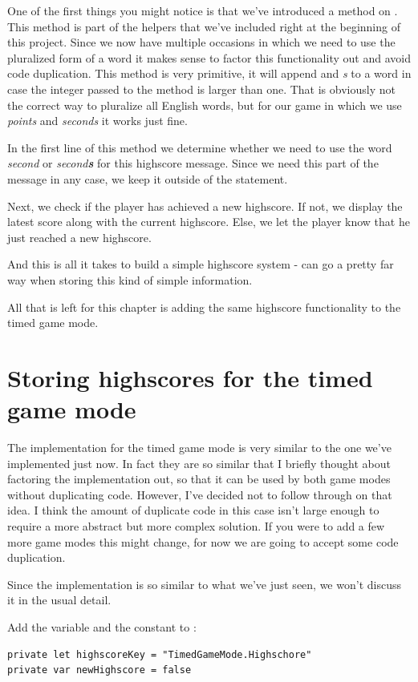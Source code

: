 One of the first things you might notice is that we've introduced a
 method on . This method is
part of the helpers that we've included right at the beginning of this project.
Since we now have multiple occasions in which we need to use the pluralized form
of a word it makes sense to factor this functionality out and avoid code
duplication. This  method is very primitive, it will
append and \textit{s} to a word in case the integer passed to the method is
larger than one. That is obviously not the correct way to pluralize all English 
words, but for our game in which we use \textit{points} and \textit{seconds} it
works just fine.

In the first line of this method we determine whether we need to use the word
\textit{second} or \textit{second\textbf{s}} for this highscore message. Since
we need this part of the message in any case, we keep it outside of the
 statement.

Next, we check if the player has achieved a new highscore. If not, we display
the latest score along with the current highscore. Else, we let the player know
that he just reached a new highscore.

And this is all it takes to build a simple highscore system -
 can go a pretty far way when storing this kind of
simple information.

All that is left for this chapter is adding the same highscore functionality to
the timed game mode.

\section{Storing highscores for the timed game mode}
The implementation for the timed game mode is very similar to the one we've
implemented just now. In fact they are so similar that I briefly thought about
factoring the implementation out, so that it can be used by both game modes
without duplicating code. However, I've decided not to follow through on that
idea. I think the amount of duplicate code in this case isn't large enough to
require a more abstract but more complex solution. If you were to add a few more
game modes this might change, for now we are going to accept some code
duplication.

Since the implementation is so similar to what we've just seen, we won't discuss
it in the usual detail.

\begin{leftbar}
Add the  variable and the 
constant to :
\begin{lstlisting}
private let highscoreKey = "TimedGameMode.Highschore"
private var newHighscore = false
\end{lstlisting}
\end{leftbar}

